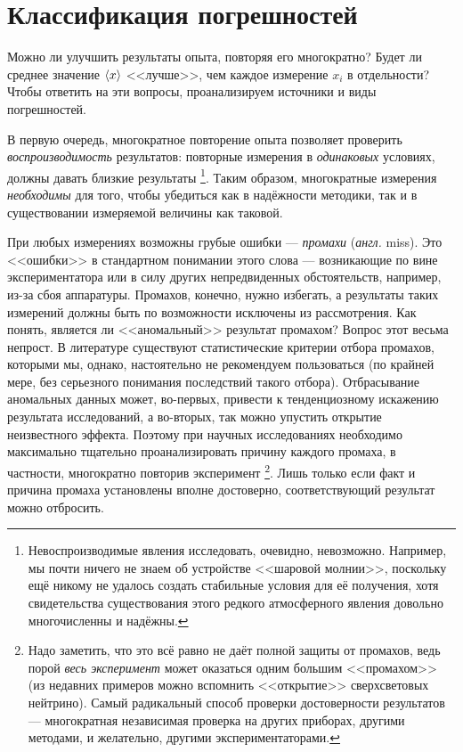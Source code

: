 \section{Классификация погрешностей}

Можно ли улучшить результаты опыта, повторяя его многократно? Будет
ли среднее значение $\left<x\right>$ <<лучше>>,
чем каждое измерение $x_{i}$ в отдельности? Чтобы ответить на эти
вопросы, проанализируем источники и виды погрешностей.

В первую очередь, многократное повторение опыта позволяет проверить
\emph{воспроизводимость} результатов: повторные измерения в \emph{одинаковых}
условиях, должны давать близкие результаты \footnote{Невоспроизводимые явления исследовать, очевидно, невозможно. Например,
мы почти ничего не знаем об устройстве <<шаровой молнии>>,
поскольку ещё никому не удалось создать стабильные условия для её
получения, хотя свидетельства существования этого редкого атмосферного
явления довольно многочисленны и надёжны.}. Таким образом, многократные измерения \emph{необходимы} для того,
чтобы убедиться как в надёжности методики, так и в существовании измеряемой
величины как таковой.

При любых измерениях возможны грубые ошибки --- \emph{промахи}
(\emph{англ.} miss). Это <<ошибки>> в стандартном
понимании этого слова --- возникающие по вине экспериментатора
или в силу других непредвиденных обстоятельств, например, из-за сбоя
аппаратуры. Промахов, конечно, нужно избегать, а результаты таких
измерений должны быть по возможности исключены из рассмотрения. Как
понять, является ли <<аномальный>> результат
промахом? Вопрос этот весьма непрост. В литературе существуют статистические
критерии отбора промахов, которыми мы, однако, настоятельно не рекомендуем
пользоваться (по крайней мере, без серьезного понимания последствий
такого отбора). Отбрасывание аномальных данных может, во-первых, привести
к тенденциозному искажению результата исследований, а во-вторых, так
можно упустить открытие неизвестного эффекта. Поэтому при научных
исследованиях необходимо максимально тщательно проанализировать причину
каждого промаха, в частности, многократно повторив эксперимент \footnote{Надо заметить, что это всё равно не даёт полной защиты от промахов,
ведь порой \emph{весь эксперимент} может оказаться одним большим <<промахом>>
(из недавних примеров можно вспомнить <<открытие>>
сверхсветовых нейтрино). Самый радикальный способ проверки достоверности
результатов --- многократная независимая проверка на других
приборах, другими методами, и желательно, другими экспериментаторами.}. Лишь только если факт и причина промаха установлены вполне достоверно,
соответствующий результат можно отбросить.


